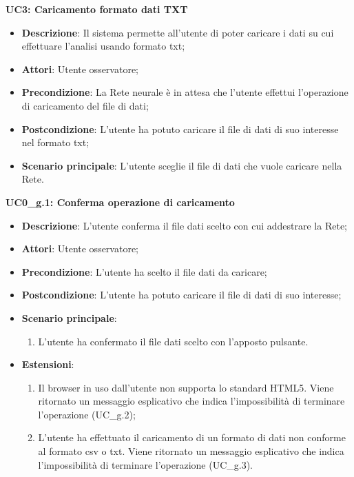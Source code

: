 \textbf{UC3: Caricamento formato dati TXT}\mbox{}
\label{UC3: Caricamento formato dati TXT}
\begin{itemize}
\item \textbf{Descrizione}: Il sistema permette all'utente di poter caricare i dati su cui effettuare l'analisi usando formato txt;
\item \textbf{Attori}: Utente osservatore;
\item \textbf{Precondizione}: La Rete neurale \`e in attesa che l'utente effettui l'operazione di caricamento del file di dati;
\item \textbf{Postcondizione}: L'utente ha potuto caricare il file di dati di suo interesse nel formato txt;
\item \textbf{Scenario principale}: L'utente sceglie il file di dati che vuole caricare nella Rete.
\end{itemize}

\textbf{UC0\_g.1: Conferma operazione di caricamento}\mbox{}
\label{UC0_g.1: Conferma operazione di caricamento}
\begin{itemize}
\item \textbf{Descrizione}: L'utente conferma il file dati scelto con cui addestrare la Rete;
\item \textbf{Attori}: Utente osservatore;
\item \textbf{Precondizione}: L'utente ha scelto il file dati da caricare;
\item \textbf{Postcondizione}: L'utente ha potuto caricare il file di dati di suo interesse;
\item \textbf{Scenario principale}:
\begin{enumerate}
\item L'utente ha confermato il file dati scelto con l'apposto pulsante.
\end{enumerate}
\item \textbf{Estensioni}:
\begin{enumerate}
\item Il browser in uso dall'utente non supporta lo standard HTML5. Viene ritornato un messaggio esplicativo che indica l'impossibilit\`a di terminare l'operazione (UC\_g.2);
\item L'utente ha effettuato il caricamento di un formato di dati non conforme al formato csv o txt.  Viene ritornato un messaggio esplicativo che indica l'impossibilit\`a di terminare l'operazione (UC\_g.3).
\end{enumerate}
\end{itemize}


